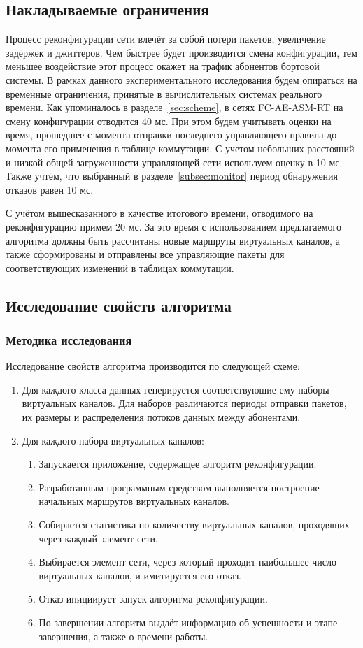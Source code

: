 \documentclass[12pt, a4paper]{article}
\begin{document}
\subsection{Накладываемые ограничения} \label{subsec:limits}
Процесс реконфигурации сети влечёт за собой потери пакетов, увеличение задержек и джиттеров. Чем быстрее будет производится смена конфигурации, тем меньшее воздействие этот процесс окажет на трафик абонентов бортовой системы. В рамках данного экспериментального исследования будем опираться на временные ограничения, принятые в вычислительных системах реального времени. Как упоминалось в разделе~\ref{sec:scheme}, в сетях FC-AE-ASM-RT на смену конфигурации отводится 40 мс. При этом будем учитывать оценки на время, прошедшее с момента отправки последнего управляющего правила до момента его применения в таблице коммутации. С учетом небольших расстояний и низкой общей загруженности управляющей сети используем оценку в 10 мс. Также учтём, что выбранный в разделе~\ref{subsec:monitor} период обнаружения отказов равен 10 мс.

С учётом вышесказанного в качестве итогового времени, отводимого на реконфигурацию примем 20 мс. За это время с использованием предлагаемого алгоритма должны быть рассчитаны новые маршруты виртуальных каналов, а также сформированы и отправлены все управляющие пакеты для соответствующих изменений в таблицах коммутации.

\subsection{Исследование свойств алгоритма}
\subsubsection{Методика исследования}
Исследование свойств алгоритма производится по следующей схеме:
\begin{enumerate}
	\item Для каждого класса данных генерируется соответствующие ему наборы виртуальных каналов. Для наборов различаются периоды отправки пакетов, их размеры и распределения потоков данных между абонентами.
	\item Для каждого набора виртуальных каналов:
	\begin{enumerate}
		\item Запускается приложение, содержащее алгоритм реконфигурации.
		\item Разработанным программным средством выполняется построение начальных маршрутов виртуальных каналов.
		\item Собирается статистика по количеству виртуальных каналов, проходящих через каждый элемент сети.
		\item Выбирается элемент сети, через который проходит наибольшее число виртуальных каналов, и имитируется его отказ.
		\item Отказ инициирует запуск алгоритма реконфигурации.
		\item По завершении алгоритм выдаёт информацию об успешности и этапе завершения, а также о времени работы.
	\end{enumerate}
\end{enumerate}
\end{document}
